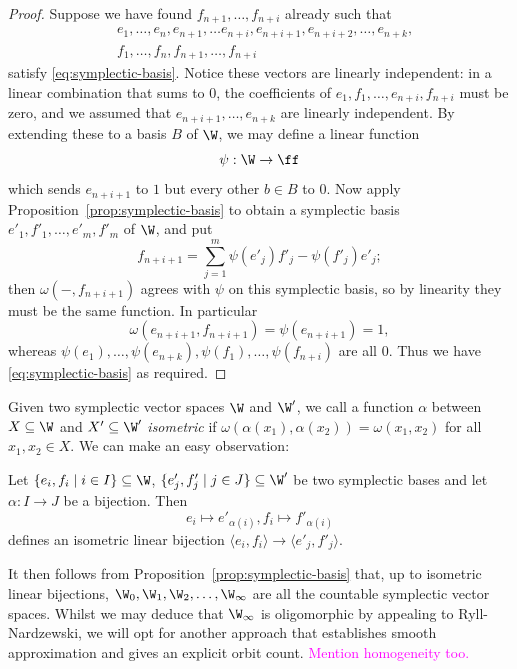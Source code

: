 \begin{proof}
    Suppose we have found $f_{n+1}, \ldots, f_{n+i}$ already such that
    \begin{align*}
        &e_1, \ldots, e_n, e_{n+1}, \ldots e_{n+i}, e_{n+i+1}, e_{n+i+2}, \ldots, e_{n+k},\\ 
        &f_1, \ldots, f_n, f_{n+1}, \ldots, f_{n+i}
    \end{align*}
    satisfy \eqref{eq:symplectic-basis}.
    Notice these vectors are linearly independent:
    in a linear combination that sums to $0$,
    the coefficients of $e_1, f_1, \dots, e_{n+i}, f_{n+i}$ must be zero,
    and we assumed that $e_{n+i+1}, \dots, e_{n+k}$ are linearly independent.
    By extending these to a basis $B$ of $\W$, we may define a linear function 
    \[
        \psi : \W \to \ff
    \]
    which sends $e_{n+i+1}$ to $1$ but every other $b \in B$ to $0$.
    Now apply Proposition~\ref{prop:symplectic-basis} to obtain a symplectic basis $e'_1, f'_1, \dots, e'_m, f'_m$ of $\W$, and put
    \[
        f_{n+i+1} = \sum_{j=1}^m \psi(e'_j) f'_j - \psi(f'_j) e'_j;
    \]
    then $\omega(-, f_{n+i+1})$ agrees with $\psi$ on this symplectic basis, so by linearity they must be the same function.
    In particular 
    \[
        \omega(e_{n+i+1}, f_{n+i+1}) = \psi(e_{n+i+1}) = 1,
    \]
    whereas $\psi(e_1), \dots, \psi(e_{n+k}), \psi(f_1), \dots, \psi(f_{n+i})$ are all $0$.
    Thus we have \eqref{eq:symplectic-basis} as required.
\end{proof}

Given two symplectic vector spaces $\W$ and $\W'$,
we call a function $\alpha$ between $X \subseteq \W$ and $X' \subseteq \W'$ \emph{isometric} if 
$\omega(\alpha(x_1), \alpha(x_2)) = \omega(x_1, x_2)$ for all $x_1, x_2 \in X$.
We can make an easy observation:
\begin{lemma}\label{lem:symplectic-basis-gives-isometry}
Let $\{e_i, f_i \mid i \in I\} \subseteq \W$, $\{e'_j, f'_j \mid j \in J\} \subseteq \W'$ be two symplectic bases
and let $\alpha : I \to J$ be a bijection.
Then 
\[
    e_i \mapsto e'_{\alpha(i)}, f_i \mapsto f'_{\alpha(i)}
\]
defines an isometric linear bijection $\langle e_i, f_i \rangle \to \langle e'_j, f'_j \rangle$.
\end{lemma}

It then follows from Proposition~\ref{prop:symplectic-basis} that, 
up to isometric linear bijections, 
$\W_0, \W_1, \W_2, \ldots, \W_\infty$ are all the countable symplectic vector spaces.
Whilst we may deduce that $\W_\infty$ is oligomorphic by appealing to Ryll-Nardzewski,
we will opt for another approach that establishes smooth approximation and gives an explicit orbit count.
\textcolor{magenta}{Mention homogeneity too.}

